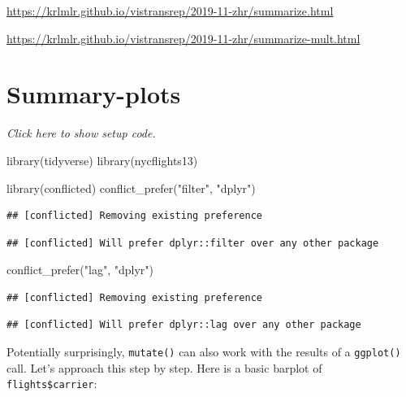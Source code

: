 \documentclass[]{book}
\newenvironment{Shaded}{}{}
\newcommand{\DataTypeTok}[1]{#1}
\newcommand{\KeywordTok}[1]{\textcolor[rgb]{0.00,0.00,1.00}{#1}}
\newcommand{\NormalTok}[1]{#1}
\newcommand{\OperatorTok}[1]{#1}
\newcommand{\StringTok}[1]{\textcolor[rgb]{0.00,0.50,0.50}{#1}}
\begin{document}
\url{https://krlmlr.github.io/vistransrep/2019-11-zhr/summarize.html}

\url{https://krlmlr.github.io/vistransrep/2019-11-zhr/summarize-mult.html}

\hypertarget{summary-plots}{%
\section{Summary-plots}\label{summary-plots}}

\emph{Click here to show setup code.}

\begin{Shaded}
\begin{Highlighting}[]
\KeywordTok{library}\NormalTok{(tidyverse)}
\KeywordTok{library}\NormalTok{(nycflights13)}

\KeywordTok{library}\NormalTok{(conflicted)}
\KeywordTok{conflict_prefer}\NormalTok{(}\StringTok{"filter"}\NormalTok{, }\StringTok{"dplyr"}\NormalTok{)}
\end{Highlighting}
\end{Shaded}

\begin{verbatim}
## [conflicted] Removing existing preference
\end{verbatim}

\begin{verbatim}
## [conflicted] Will prefer dplyr::filter over any other package
\end{verbatim}

\begin{Shaded}
\begin{Highlighting}[]
\KeywordTok{conflict_prefer}\NormalTok{(}\StringTok{"lag"}\NormalTok{, }\StringTok{"dplyr"}\NormalTok{)}
\end{Highlighting}
\end{Shaded}

\begin{verbatim}
## [conflicted] Removing existing preference
\end{verbatim}

\begin{verbatim}
## [conflicted] Will prefer dplyr::lag over any other package
\end{verbatim}

Potentially surprisingly, \texttt{mutate()} can also work with the results of a \texttt{ggplot()} call.
Let's approach this step by step.
Here is a basic barplot of \texttt{flights\$carrier}:

\begin{Shaded}
\end{Shaded}
\end{document}
